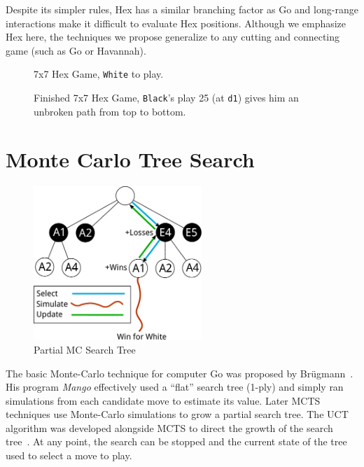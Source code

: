 \documentclass{acm_proc_article-sp}
\newcommand{\hblack}{\texttt{Black}}
\newcommand{\hwhite}{\texttt{White}}
\newcommand{\loc}[1]{\texttt{#1}}
\begin{document}
Despite its simpler rules, Hex has a similar branching factor as Go and long-range interactions make it difficult to 
evaluate Hex positions.
Although we emphasize Hex here, the techniques we propose generalize to any cutting and connecting game
(such as Go or Havannah).

\begin{figure}[tb]
	\caption{7x7 Hex Game, \hwhite{} to play.}
	\label{fig:inprogress}
\end{figure}

\begin{figure}[tb]
	\caption{Finished 7x7 Hex Game, \hblack{}'s play 25 (at \loc{d1}) gives him an unbroken path from top to bottom.}
	\label{fig:finished}
\end{figure}


\section{Monte Carlo Tree Search} \label{mcts}

\begin{figure}
	\begin{center}
	\includegraphics[width=2.5in]{graphics/tree.pdf}
	\end{center}
	\caption{Partial MC Search Tree}
	\label{fig:tree}
\end{figure}

The basic Monte-Carlo technique for computer Go was proposed by Br\"{u}gmann~\cite{brugmann1993monte}. His program \emph{Mango} effectively used a ``flat'' search tree (1-ply) and simply ran simulations from each candidate move to estimate its value. 
Later MCTS techniques use Monte-Carlo simulations to grow a partial search tree. 
The UCT algorithm was developed alongside MCTS to direct the growth of the search tree~\cite{gelly2006exploration}. 
At any point, the search can be stopped and the current state of the tree used to select a move to play. 
\end{document}
